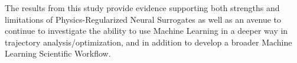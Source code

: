 The results from this study provide evidence supporting both strengths and limitations of Physics-Regularized Neural Surrogates 
as well as an avenue to continue to investigate the ability to use Machine Learning in a deeper way in trajectory analysis/optimization, 
and in addition to develop a broader Machine Learning Scientific Workflow.